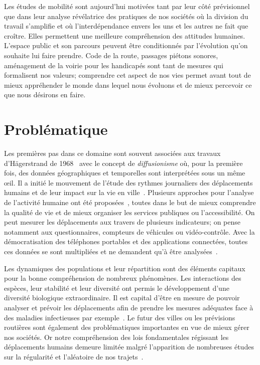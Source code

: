 Les études de mobilité sont aujourd'hui motivées tant par leur côté prévisionnel que dans leur analyse révélatrice des pratiques de nos sociétés où la division du travail s'amplifie et où l'interdépendance envers les uns et les autres ne fait que croître. Elles permettent une meilleure compréhension des attitudes humaines. L'espace public et son parcours peuvent être conditionnés par l'évolution qu'on souhaite lui faire prendre. Code de la route, passages piétons sonores, aménagement de la voirie pour les handicapés sont tant de mesures qui formalisent nos valeurs; comprendre cet aspect de nos vies permet avant tout de mieux appréhender le monde dans lequel nous évoluons et de mieux percevoir ce que nous désirons en faire.

\section{Problématique}

Les premières pas dans ce domaine sont souvent associées aux travaux d'Hägerstrand de 1968~\cite{hagerstrand1968innovation} avec le concept de \textit{diffusionisme} où, pour la première fois, des données géographiques et temporelles sont interprétées sous un même œil. Il a initié le mouvement de l'étude des rythmes journaliers des déplacements humains et de leur impact sur la vie en ville~\cite{newsome1998urban, axhausen2002observing}. Plusieurs approches pour l'analyse de l'activité humaine ont été proposées~\cite{miller2009geographic}, toutes dans le but de mieux comprendre la qualité de vie et de mieux organiser les services publiques ou l'accessibilité. On peut mesurer les déplacements aux travers de plusieurs indicateurs; on pense notamment aux questionnaires, compteurs de véhicules ou vidéo-contrôle. Avec la démocratisation des téléphones portables et des applications connectées, toutes ces données se sont multipliées et ne demandent qu'à être analysées~\cite{zheng2008understanding}.

Les dynamiques des populations et leur répartition sont des éléments capitaux pour la bonne compréhension de nombreux phénomènes. Les interactions des espèces, leur stabilité et leur diversité ont permis le développement d'une diversité biologique extraordinaire. Il est capital d'être en mesure de pouvoir analyser et prévoir les déplacements afin de prendre les mesures adéquates face à des maladies infectieuses par exemple~\cite{grenfell2001travelling}. Le futur des villes ou les prévisions routières sont également des problématiques importantes en vue de mieux gérer nos sociétés. Or notre compréhension des lois fondamentales régissant les déplacements humains demeure limitée malgré l'apparition de nombreuses études sur la régularité et l'aléatoire de nos trajets~\cite{gonzalez2008understanding}.

